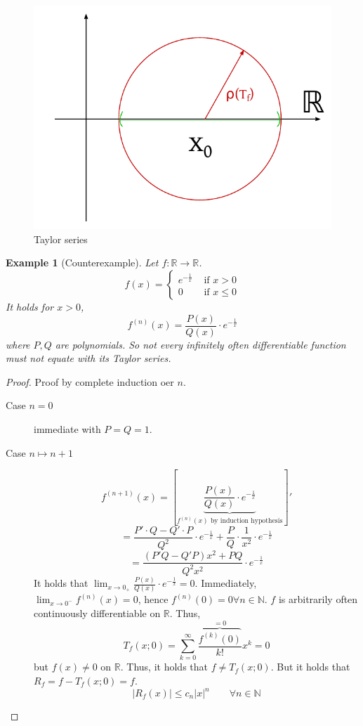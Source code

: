 \documentclass{article}
\newtheorem{example}{Example}  \numberwithin{example}{section}
\newcommand{\card}[1]{\left|#1\right|}
\begin{document}
\begin{figure}[t]
  \begin{center}
    \includegraphics{img/28_Taylor_series.pdf}
    \caption{Taylor series}
    \label{img:tay}
  \end{center}
\end{figure}

\begin{example}[Counterexample]
  Let $f: \mathbb R \to \mathbb R$.
  \[ f(x) = \begin{cases} e^{-\frac1x} & \text{ if } x > 0 \\ 0 & \text{ if } x \leq 0 \end{cases} \]
  It holds for $x > 0$,
  \[ f^{(n)}(x) = \frac{P(x)}{Q(x)} \cdot e^{-\frac1x} \]
  where $P, Q$ are polynomials.
  So not every infinitely often differentiable function must not equate with its Taylor series. %
\end{example}

\begin{proof}
  Proof by complete induction oer $n$.

  \begin{description}
    \item[Case $n=0$] immediate with $P = Q = 1$.
    \item[Case $n\mapsto n+1$]
      \[ f^{(n+1)}(x) = \left[\underbrace{\frac{P(x)}{Q(x)} \cdot e^{-\frac1x}}_{f^{(n)}(x) \text{ by induction hypothesis}}\right]' \]
      \[ = \frac{P' \cdot Q - Q' \cdot P}{Q^2} \cdot e^{-\frac1x} + \frac PQ \cdot \frac1{x^2} \cdot e^{-\frac1x} \]
      \[ = \frac{(P' Q - Q' P) x^2 + PQ}{Q^2 x^2} \cdot e^{-\frac1x} \]
      It holds that $\lim_{x\to0_+} \frac{P(x)}{Q(x)} \cdot e^{-\frac1x} = 0$.
      Immediately, $\lim_{x \to 0^-} f^{(n)}(x) = 0$, hence $f^{(n)}(0) = 0 \forall n \in \mathbb N$.
      $f$ is arbitrarily often continuously differentiable on $\mathbb R$. Thus,
      \[ T_f(x; 0) = \sum_{k=0}^\infty \frac{\overbrace{f^{(k)}(0)}^{=0}}{k!} x^k = 0 \]
      but $f(x) \neq 0$ on $\mathbb R$. Thus, it holds that $f \neq T_f(x; 0)$.
      But it holds that $R_f = f - T_f(x; 0) = f$.
      \[ \card{R_f(x)} \leq c_n \card{x}^n \qquad \forall n \in \mathbb N \]
  \end{description}
\end{proof}
\end{document}
